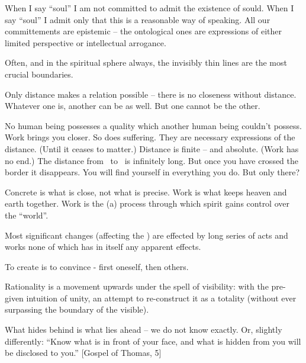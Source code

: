 
\pa
When I say ``soul'' I am not committed to admit the existence of sould. When
I say ``soul'' I admit only that this is a reasonable way of speaking. All
our committements are epistemic -- the ontological ones are expressions of
either limited perspective or intellectual arrogance.

\pa
Often, and in the spiritual sphere always, the invisibly thin lines are the most
crucial boundaries. 


\pa
Only distance makes a relation possible -- there is no closeness without distance.
\pa
Whatever one is, another can be as well. But one cannot be the other.

No human being possesses a quality which another human being couldn't possess.
\pa
Work brings you closer. So does suffering. They are necessary
expressions of the distance. (Until it ceases to matter.)
\pa
Distance is finite -- and absolute. (Work has no end.)
\pa
The distance from \LL\ to \HH\ is infinitely long. But once you have
crossed the border it disappears.
\pa
You will find yourself in everything you do. But only there?



\pa
Concrete is what is close, not what is precise.
\pa
Work is what keeps heaven and earth together.
\pa
Work is the (a) process through which spirit gains control over the ``world''.

\pa
Most significant changes (affecting the \HH) are effected by long series of 
acts and works none of which has in itself any apparent effects.

\pa
To create is to convince - first oneself, then others.

\pa
Rationality is a movement upwards under the spell of visibility: with the
pre-given intuition of unity, an attempt to re-construct it as a totality
(without ever surpassing the boundary of the visible).

\pa
What hides behind is what lies ahead -- we do not know exactly. Or, slightly
differently: 
``Know what is in front of your face, and what is hidden from
you will be disclosed to you.'' [Gospel of Thomas, 5]

